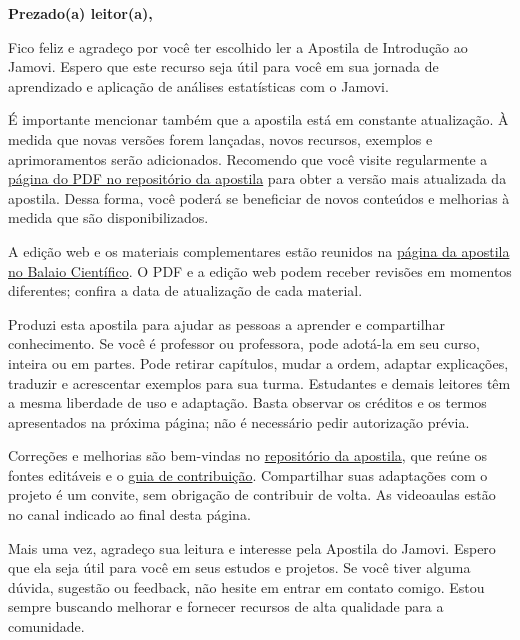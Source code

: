 
\begin{flushleft}
\Huge\textbf{Prezado(a) leitor(a),}
\end{flushleft}

Fico feliz e agradeço por você ter escolhido ler a Apostila de Introdução ao Jamovi. Espero que este recurso seja útil para você em sua jornada de aprendizado e aplicação de análises estatísticas com o Jamovi.

É importante mencionar também que a apostila está em constante atualização. À medida que novas versões forem lançadas, novos recursos, exemplos e aprimoramentos serão adicionados. Recomendo que você visite regularmente a \href{https://github.com/erickfaria/apostilaJamovi/blob/main/apostila_jamovi.pdf}{página do PDF no repositório da apostila} para obter a versão mais atualizada da apostila. Dessa forma, você poderá se beneficiar de novos conteúdos e melhorias à medida que são disponibilizados.

A edição web e os materiais complementares estão reunidos na \href{https://www.balaiocientifico.com/2022/11/apostila-de-jamovi.html}{página da apostila no Balaio Científico}. O PDF e a edição web podem receber revisões em momentos diferentes; confira a data de atualização de cada material.

Produzi esta apostila para ajudar as pessoas a aprender e compartilhar conhecimento. Se você é professor ou professora, pode adotá-la em seu curso, inteira ou em partes. Pode retirar capítulos, mudar a ordem, adaptar explicações, traduzir e acrescentar exemplos para sua turma. Estudantes e demais leitores têm a mesma liberdade de uso e adaptação. Basta observar os créditos e os termos apresentados na próxima página; não é necessário pedir autorização prévia.

Correções e melhorias são bem-vindas no \href{https://github.com/erickfaria/apostilaJamovi}{repositório da apostila}, que reúne os fontes editáveis e o \href{https://github.com/erickfaria/apostilaJamovi/blob/main/CONTRIBUTING.md}{guia de contribuição}. Compartilhar suas adaptações com o projeto é um convite, sem obrigação de contribuir de volta. As videoaulas estão no canal indicado ao final desta página.

Mais uma vez, agradeço sua leitura e interesse pela Apostila do Jamovi. Espero que ela seja útil para você em seus estudos e projetos. Se você tiver alguma dúvida, sugestão ou feedback, não hesite em entrar em contato comigo. Estou sempre buscando melhorar e fornecer recursos de alta qualidade para a comunidade.

